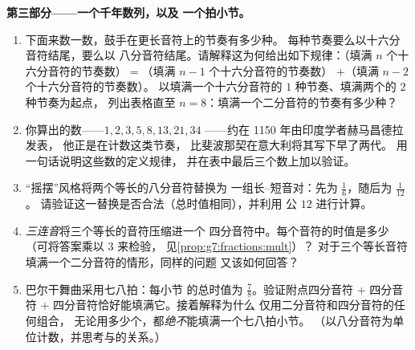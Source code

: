 \begin{problem}
\medskip
\noindent\textbf{第三部分——一个千年数列，以及
一个拍小节。}
\begin{enumerate}[resume]
  \item 下面来数一数，鼓手在更长音符上的节奏有多少种。
        每种节奏要么以十六分音符结尾，要么以
        八分音符结尾。请解释这为何给出如下规律：（填满
        $n$ 个十六分音符的节奏数）$=$（填满 $n - 1$ 个十六分音符的节奏数）
        $+$（填满 $n - 2$ 个十六分音符的节奏数）。
        以填满一个十六分音符的 $1$ 种节奏、填满两个的 $2$ 种节奏为起点，
        列出表格直至 $n = 8$：填满一个二分音符的节奏有多少种？
  \item 你算出的数——$1, 2, 3, 5, 8, 13, 21, 34$
——约在 1150 年由印度学者赫马昌德拉发表，
        他正是在计数这类节奏，
        比斐波那契在意大利将其写下早了两代。
        用一句话说明这些数的定义规律，
        并在表中最后三个数上加以验证。
  \item “摇摆”风格将两个等长的八分音符替换为
        一组长--短音对：先为 $\frac16$，随后为 $\frac{1}{12}$。
        请验证这一替换是否合法（总时值相同），并利用
        公 $12$ 进行计算。
  \item \emph{三连音}将三个等长的音符压缩进一个
        四分音符中。每个音符的时值是多少（可将答案乘以 $3$ 来检验，
        见\cref{prop:g7:fractions:mult}）？
        对于三个等长音符填满一个二分音符的情形，同样的问题
        又该如何回答？
  \item 巴尔干舞曲采用七八拍：每小节
        的总时值为 $\frac78$。验证附点四分音符 $+$ 四分音符
        $+$ 四分音符恰好能填满它。接着解释为什么
        仅用二分音符和四分音符的任何组合，
        无论用多少个，都\emph{绝不}能填满一个七八拍小节。
        （以八分音符为单位计数，并思考与的关系。）
\end{enumerate}
\end{problem}
